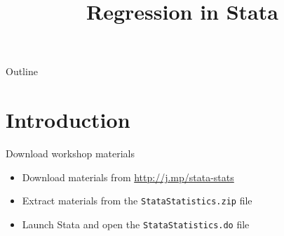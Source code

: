 \documentclass[table,smaller]{beamer}
\institute{Harvard MIT Data Center}
\author{}
\date{}
\title{Regression in Stata}
\begin{document}
\maketitle
\begin{frame}{Outline}
\tableofcontents
\end{frame}


\section{Introduction}
\label{sec-1}

\begin{frame}[fragile,label=sec-1-1]{Download workshop materials}
 \begin{itemize}
\item Download materials from \url{http://j.mp/stata-stats}
\item Extract materials from the \texttt{StataStatistics.zip} file
\item Launch Stata and open the \texttt{StataStatistics.do} file
\end{itemize}
\end{frame}
\end{document}
